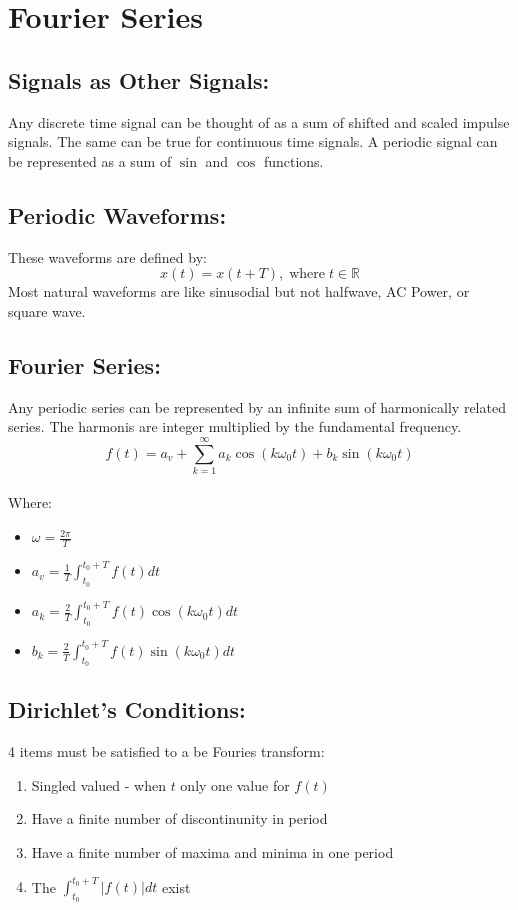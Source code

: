 \documentclass[a5paper]{article}
\begin{document}
	\section{Fourier Series}
	\subsection{Signals as Other Signals:}
	Any discrete time signal can be thought of as a sum of shifted and scaled impulse signals. The same can be true for continuous time signals. A periodic signal can be represented as a sum of $\sin$ and $\cos$ functions.
	\subsection{Periodic Waveforms:}
	These waveforms are defined by:
	$$x(t)=x(t+T),\;\text{where}\;t\in\mathbb{R}$$
	Most natural waveforms are like sinusodial but not halfwave, AC Power, or square wave.
	\subsection{Fourier Series:}
	Any periodic series can be represented by an infinite sum of harmonically related series. The harmonis are integer multiplied by the fundamental frequency.
	$$f(t)=a_{v}+\sum^{\infty}_{k=1}a_{k}\cos{(k\omega_{0}t)}+b_{k}\sin{(k\omega_{0}t)}$$
	\pagebreak\\
	Where:
	\begin{itemize}
		\item $\omega=\frac{2\pi}{T}$
		\item $a_{v}=\frac{1}{T}\int^{t_{0}+T}_{t_{0}}f(t)dt$
		\item $a_{k}=\frac{2}{T}\int^{t_{0}+T}_{t_{0}}f(t)\cos{(k\omega_{0}t)}dt$
		\item $b_{k}=\frac{2}{T}\int^{t_{0}+T}_{t_{0}}f(t)\sin{(k\omega_{0}t)}dt$
	\end{itemize}
	\subsection{Dirichlet's Conditions:}
	4 items must be satisfied to a be Fouries transform:
	\begin{enumerate}
		\item Singled valued - when $t$ only one value for $f(t)$
		\item Have a finite number of discontinunity in period
		\item Have a finite number of maxima and minima in one period
		\item The $\int^{t_{0}+T}_{t_{0}}|f(t)|dt$ exist
	\end{enumerate}
\end{document}

